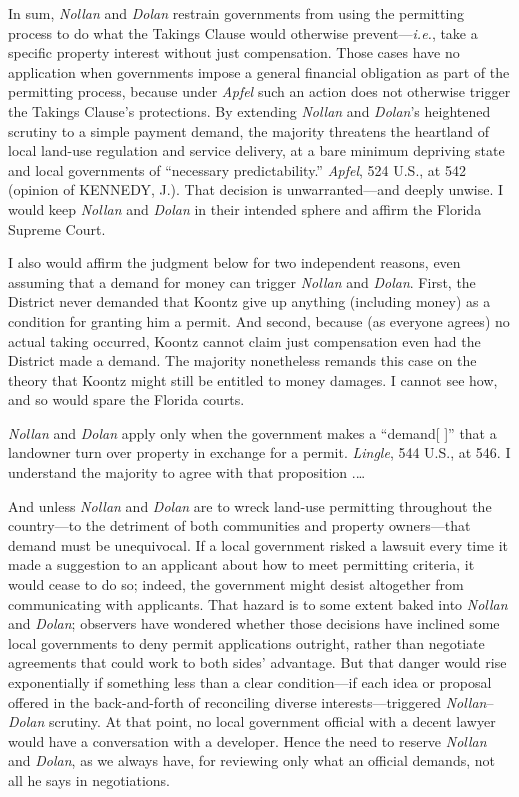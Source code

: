 In sum, \textit{Nollan} and \textit{Dolan} restrain governments from using the
permitting process to do what the Takings Clause would otherwise
prevent---\textit{i.e.}, take a specific property interest without just
compensation. Those cases have no application when governments impose a general
financial obligation as part of the permitting process, because under
\textit{Apfel} such an action does not otherwise trigger the Takings Clause's
protections. By extending \textit{Nollan} and \textit{Dolan}'s heightened
scrutiny to a simple payment demand, the majority threatens the heartland of
local land-use regulation and service delivery, at a bare minimum depriving
state and local governments of ``necessary predictability.'' \textit{Apfel}, 524
U.S., at 542 (opinion of KENNEDY, J.). That decision is unwarranted---and deeply
unwise. I would keep \textit{Nollan} and \textit{Dolan} in their intended sphere
and affirm the Florida Supreme Court.



I also would affirm the judgment below for two independent reasons, even
assuming that a demand for money can trigger \textit{Nollan} and \textit{Dolan}.
First, the District never demanded that Koontz give up anything (including
money) as a condition for granting him a permit. And second, because (as
everyone agrees) no actual taking occurred, Koontz cannot claim just
compensation even had the District made a demand. The majority nonetheless
remands this case on the theory that Koontz might still be entitled to money
damages. I cannot see how, and so would spare the Florida courts.



\textit{Nollan} and \textit{Dolan} apply only when the government makes a
``demand[ ]'' that a landowner turn over property in exchange for a permit.
\textit{Lingle}, 544 U.S., at 546. I understand the majority to agree with that
proposition .\ldots

And unless \textit{Nollan} and \textit{Dolan} are to wreck land-use permitting
throughout the country---to the detriment of both communities and property
owners---that demand must be unequivocal. If a local government risked a lawsuit
every time it made a suggestion to an applicant about how to meet permitting
criteria, it would cease to do so; indeed, the government might desist
altogether from communicating with applicants. That hazard is to some extent
baked into \textit{Nollan} and \textit{Dolan}; observers have wondered whether
those decisions have inclined some local governments to deny permit applications
outright, rather than negotiate agreements that could work to both sides'
advantage. But that danger would rise exponentially if something less than a
clear condition---if each idea or proposal offered in the back-and-forth of
reconciling diverse interests---triggered \textit{Nollan}--\textit{Dolan}
scrutiny. At that point, no local government official with a decent lawyer would
have a conversation with a developer. Hence the need to reserve \textit{Nollan}
and \textit{Dolan}, as we always have, for reviewing only what an official
demands, not all he says in negotiations.

